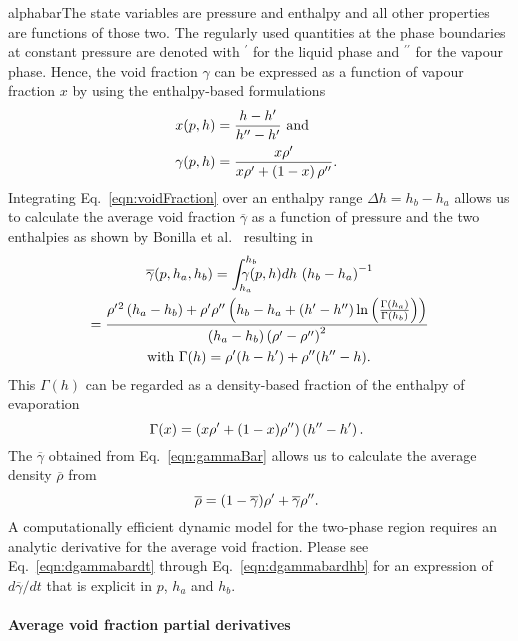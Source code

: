 {\gls{alphabar}The state variables are pressure and enthalpy and all other properties are functions of those two. The regularly used quantities at the phase boundaries at constant pressure are denoted with $^\prime$ for the liquid phase and $^{\prime\prime}$ for the vapour phase. Hence, the void fraction $\gamma$ can be expressed as a function of vapour fraction $x$ by using the enthalpy-based formulations
\begin{align}
x(p,h)      &= \frac{h-h^\prime}{h^{\prime\prime}-h^\prime} \text{ and } \label{eqn:vapourFraction} \\
\gamma(p,h) &= \frac{x \rho^\prime}{ x \rho^\prime + \left( 1 - x \right) \rho^{\prime\prime} }\text{. } \label{eqn:voidFraction}
\end{align}
Integrating Eq.~\ref{eqn:voidFraction} over an enthalpy range $\Delta h = h_b - h_a$ allows us to calculate the average void fraction $\overline{\gamma}$ as a function of pressure and the two enthalpies as shown by Bonilla et al.~\cite{Bonilla2015} resulting in 
\begin{gather}
\overline{\gamma}(p,h_a,h_b) = \int_{h_a}^{h_b}\!\!\!\!\!\!\!\!  \gamma(p,h)dh \, \left(h_b - h_a \right)^{-1} \\
= \frac{\rhop{}^2 \left(h_a-h_b\right) + \rhop\rhopp \left(h_b-h_a+\left(\hp-\hpp\right) \ln \left(\frac{\Gamma\left(h_a\right)}{\Gamma\left(h_b\right)}\right)\right)}
{\left(h_a-h_b\right) \left( \rhop-\rhopp \right)^2 } \label{eqn:gammaBar} \\
\text{ with } \Gamma(h) = \rhop (h-\hp) + \rhopp (\hpp-h) \text{. } \label{eqn:Gamma} 
\end{gather}
This $\Gamma(h)$ can be regarded as a density-based fraction of the enthalpy of evaporation 
\begin{equation}
\Gamma(x) = \left( x \rho^\prime + (1-x) \rho^{\prime\prime} \right) \left( h^{\prime\prime}-h^\prime \right) \text{. }
\end{equation}
The $\overline{\gamma}$ obtained from Eq.~\ref{eqn:gammaBar} allows us to calculate the average density $\overline{\rho}$ from 
\begin{equation}
\overline{\rho} = (1-\overline{\gamma}) \rho^\prime + \overline{\gamma} \rho^{\prime\prime} \text{. }
\end{equation}
A computationally efficient dynamic model for the two-phase region requires an analytic derivative for the average void fraction. Please see Eq.~\ref{eqn:dgammabardt} through Eq.~\ref{eqn:dgammabardhb} for an expression of $d\overline{\gamma}/dt$ that is explicit in $p$, $h_a$ and $h_b$. 

\paragraph{Average void fraction partial derivatives}

}
